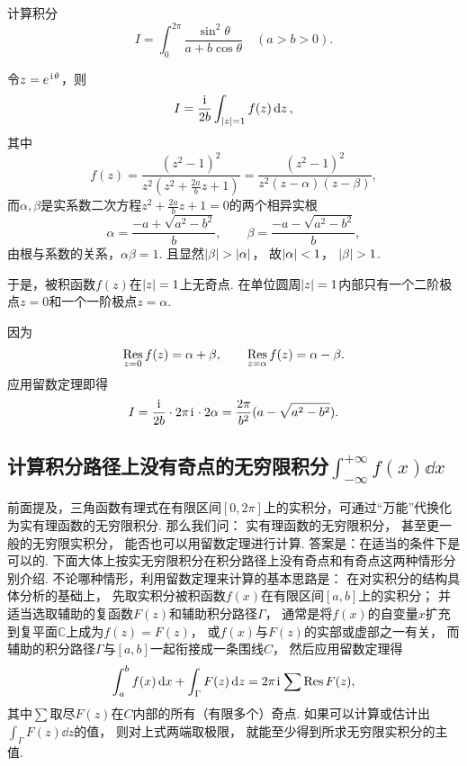 \begin{example}
计算积分\[
	I = \int_0^{2\pi} \frac{\sin^2 \theta}{a+b\cos\theta} \quad(a>b>0).
\]
\begin{solution}
令\(z=e^{\kern1pt\mathrm{i}\kern1pt\theta}\)，则\[
	I = \frac{\kern1pt\mathrm{i}\kern1pt}{2b} \int_{\abs{z}=1} f(z) \dd{z},
\]
其中\[
	f(z) = \frac{(z^2-1)^2}{z^2 \left(z^2+\frac{2a}{b}z+1\right)}
	= \frac{(z^2-1)^2}{z^2(z-\alpha)(z-\beta)},
\]
而\(\alpha,\beta\)是实系数二次方程\(z^2+\frac{2a}{b}z+1=0\)的两个相异实根\[
	\alpha=\frac{-a+\sqrt{a^2-b^2}}{b},
	\qquad
	\beta=\frac{-a-\sqrt{a^2-b^2}}{b},
\]
由根与系数的关系，\(\alpha\beta=1\).
且显然\(\abs{\beta}>\abs{\alpha}\)，
故\(\abs{\alpha}<1\)，
\(\abs{\beta}>1\).

于是，被积函数\(f(z)\)在\(\abs{z}=1\)上无奇点.
在单位圆周\(\abs{z}=1\)内部只有一个二阶极点\(z=0\)和一个一阶极点\(z=\alpha\).

因为\[
	\operatorname*{Res}_{z=0} f(z) = \alpha+\beta,
	\qquad
	\operatorname*{Res}_{z=\alpha} f(z) = \alpha-\beta.
\]
应用留数定理即得\[
	I = \frac{\kern1pt\mathrm{i}\kern1pt}{2b} \cdot 2\pi\kern1pt\mathrm{i}\kern1pt \cdot 2\alpha
	= \frac{2\pi}{b^2} (a-\sqrt{a^2-b^2}).
\]
\end{solution}
\end{example}

\subsection{计算积分路径上没有奇点的无穷限积分\texorpdfstring{\(\int_{-\infty}^{+\infty} f(x) \dd{x}\)}{}}
前面提及，三角函数有理式在有限区间\([0,2\pi]\)上的实积分，可通过“万能”代换化为实有理函数的无穷限积分.
那么我们问：
实有理函数的无穷限积分，
甚至更一般的无穷限实积分，
能否也可以用留数定理进行计算.
答案是：在适当的条件下是可以的.
下面大体上按实无穷限积分在积分路径上没有奇点和有奇点这两种情形分别介绍.
不论哪种情形，利用留数定理来计算的基本思路是：
在对实积分的结构具体分析的基础上，
先取实积分被积函数\(f(x)\)在有限区间\([a,b]\)上的实积分；
并适当选取辅助的复函数\(F(z)\)和辅助积分路径\(\Gamma\)，
通常是将\(f(x)\)的自变量\(x\)扩充到复平面\(\mathbb{C}\)上成为\(f(z)=F(z)\)，
或\(f(x)\)与\(F(z)\)的实部或虚部之一有关，
而辅助的积分路径\(\Gamma\)与\([a,b]\)一起衔接成一条围线\(C\)，
然后应用留数定理得\begin{equation}
	\int_a^b f(x) \dd{x}
	+ \int_\Gamma F(z) \dd{z}
	= 2\pi\kern1pt\mathrm{i}\kern1pt \sum \operatorname*{Res} F(z),
\end{equation}
其中\(\sum\)取尽\(F(z)\)在\(C\)内部的所有（有限多个）奇点.
如果可以计算或估计出\(\int_\Gamma F(z) \dd{z}\)的值，
则对上式两端取极限，
就能至少得到所求无穷限实积分的主值.

